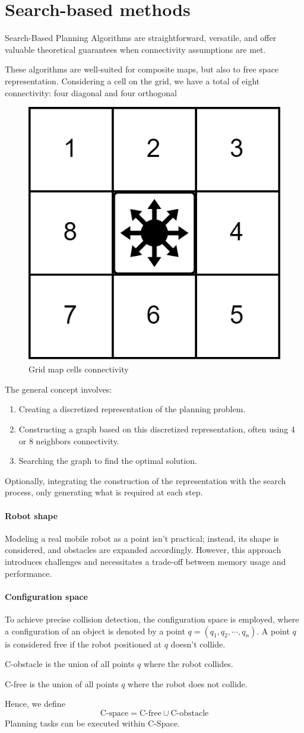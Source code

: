 \section{Search-based methods}

Search-Based Planning Algorithms are straightforward, versatile, and offer valuable theoretical guarantees when connectivity assumptions are met.

These algorithms are well-suited for composite maps, but also to free space representation. 
Considering a cell on the grid, we have a total of eight connectivity: four diagonal and four orthogonal
\begin{figure}[H]
    \centering
    \includegraphics[width=0.25\linewidth]{images/gmc.png}
    \caption{Grid map cells connectivity}
\end{figure}
The general concept involves:
\begin{enumerate}
    \item Creating a discretized representation of the planning problem.
    \item Constructing a graph based on this discretized representation, often using 4 or 8 neighbors connectivity.
    \item Searching the graph to find the optimal solution.
\end{enumerate}
Optionally, integrating the construction of the representation with the search process, only generating what is required at each step.

\paragraph*{Robot shape}
Modeling a real mobile robot as a point isn't practical; instead, its shape is considered, and obstacles are expanded accordingly. 
However, this approach introduces challenges and necessitates a trade-off between memory usage and performance.

\paragraph*{Configuration space}
To achieve precise collision detection, the configuration space is employed, where a configuration of an object is denoted by a point $q=(q_1,q_2,\cdots,q_n)$. 
A point $q$ is considered free if the robot positioned at $q$ doesn't collide. 
\begin{definition}
    C-obstacle is the union of all points $q$ where the robot collides.
\end{definition}
\begin{definition}
    C-free is the union of all points $q$ where the robot does not collide.
\end{definition}
Hence, we define
\[\text{C-space}=\text{C-free}\cup \text{C-obstacle}\]
Planning tasks can be executed within C-Space. 


